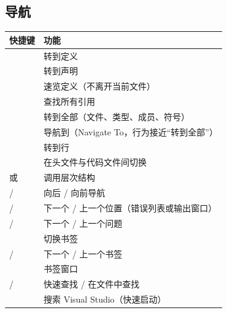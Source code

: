 \subsection{导航}
\begin{longtable}{L{4.2cm}L{10.6cm}}
\toprule
\textbf{快捷键} & \textbf{功能} \\ \midrule
\endhead \bottomrule \endlastfoot
{} & 转到定义 \\
 & 转到声明 \\
 & 速览定义（不离开当前文件） \\
 & 查找所有引用 \\
 & 转到全部（文件、类型、成员、符号） \\
 & 导航到（Navigate To，行为接近“转到全部”） \\
 & 转到行 \\
 & 在头文件与代码文件间切换 \\
 或  & 调用层次结构 \\
 /  & 向后 / 向前导航 \\
 /  & 下一个 / 上一个位置（错误列表或输出窗口） \\
 /  & 下一个 / 上一个问题 \\
 & 切换书签 \\
 /  & 下一个 / 上一个书签 \\
 & 书签窗口 \\
 /  & 快速查找 / 在文件中查找 \\
 & 搜索 Visual Studio（快速启动） \\
\end{longtable}
